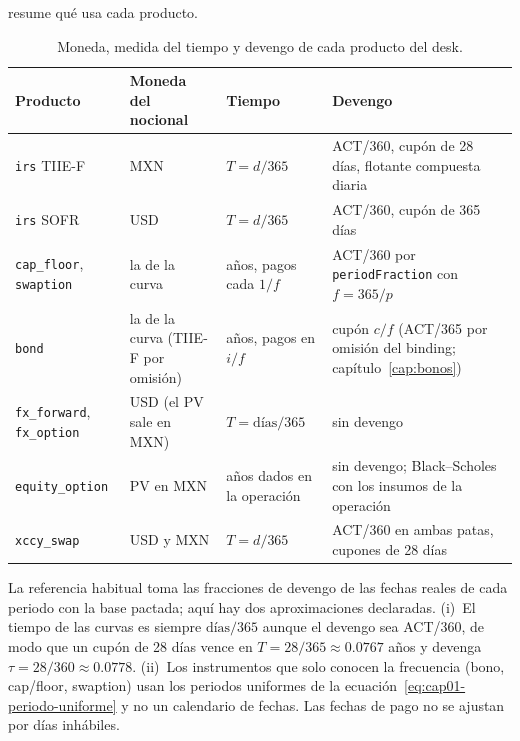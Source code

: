 \begin{sloppypar}
 resume qué usa cada producto.

\begin{table}[ht]
  \centering\small
  \caption{Moneda, medida del tiempo y devengo de cada producto del desk.}\label{tab:cap01-productos}
  \begin{tabular}{@{}>{\raggedright\arraybackslash}p{3.0cm}>{\raggedright\arraybackslash}p{3.3cm}>{\raggedright\arraybackslash}p{3.1cm}>{\raggedright\arraybackslash}p{4.7cm}@{}}
    \toprule
    Producto & Moneda del nocional & Tiempo & Devengo \\
    \midrule
    \texttt{irs} TIIE-F & MXN & $T=d/365$ & ACT/360, cupón de 28 días, flotante compuesta diaria \\
    \texttt{irs} SOFR & USD & $T=d/365$ & ACT/360, cupón de 365 días \\
    \texttt{cap\_floor}, \texttt{swaption} & la de la curva & años, pagos cada $1/f$ & ACT/360 por \texttt{periodFraction} con $f=365/p$ \\
    \texttt{bond} & la de la curva (TIIE-F por omisión) & años, pagos en $i/f$ & cupón $c/f$ (ACT/365 por omisión del binding; capítulo~\ref{cap:bonos}) \\
    \texttt{fx\_forward}, \texttt{fx\_option} & USD (el PV sale en MXN) & $T=\text{días}/365$ & sin devengo \\
    \texttt{equity\_option} & PV en MXN & años dados en la operación & sin devengo; Black--Scholes con los insumos de la operación \\
    \texttt{xccy\_swap} & USD y MXN & $T=d/365$ & ACT/360 en ambas patas, cupones de 28 días \\
    \bottomrule
  \end{tabular}
\end{table}

\begin{diferencia}
  La referencia habitual \citep{hull2018} toma las fracciones de devengo de las fechas reales de cada periodo
  con la base pactada; aquí hay dos aproximaciones declaradas. (i)~El tiempo de las curvas es siempre
  $\text{días}/365$ aunque el devengo sea ACT/360, de modo que un cupón de 28 días vence en
  $T=28/365\approx 0.0767$ años y devenga $\tau=28/360\approx 0.0778$. (ii)~Los instrumentos que solo
  conocen la frecuencia (bono, cap/floor, swaption) usan los periodos uniformes de la
  ecuación~\eqref{eq:cap01-periodo-uniforme} y no un calendario de fechas. Las fechas de pago no se ajustan
  por días inhábiles.
\end{diferencia}


\end{sloppypar}
